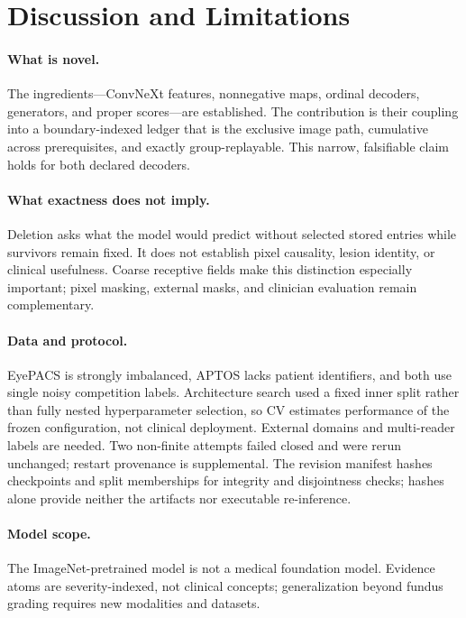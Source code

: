 \documentclass[10pt,twocolumn,letterpaper]{article}
\begin{document}
\section{Discussion and Limitations}
\label{sec:discussion}

\paragraph{What is novel.}
The ingredients---ConvNeXt features, nonnegative maps, ordinal decoders,
generators, and proper scores---are established.  The contribution is their
coupling into a boundary-indexed ledger that is the exclusive image path,
cumulative across prerequisites, and exactly group-replayable.  This narrow,
falsifiable claim holds for both declared decoders.

\paragraph{What exactness does not imply.}
Deletion asks what the model would predict without selected stored entries while
survivors remain fixed.  It does not establish pixel causality, lesion identity,
or clinical usefulness.  Coarse receptive fields make this distinction
especially important; pixel masking, external masks, and clinician evaluation
remain complementary.

\paragraph{Data and protocol.}
EyePACS is strongly imbalanced, APTOS lacks patient identifiers, and both use
single noisy competition labels.  Architecture search used a fixed inner split
rather than fully nested hyperparameter selection, so CV estimates performance
of the frozen configuration, not clinical deployment.  External domains and
multi-reader labels are needed.  Two non-finite attempts failed closed and were
rerun unchanged; restart provenance is supplemental.  The revision manifest
hashes checkpoints and split memberships for integrity and disjointness checks;
hashes alone provide neither the artifacts nor executable re-inference.

\paragraph{Model scope.}
The ImageNet-pretrained model is not a medical foundation model.  Evidence
atoms are severity-indexed, not clinical concepts; generalization beyond fundus
grading requires new modalities and datasets.
\end{document}
